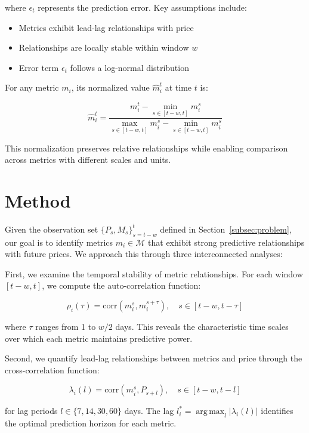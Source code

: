 \documentclass{article} %
\DeclareMathOperator*{\argmax}{arg\,max}
\begin{document}
where $\epsilon_t$ represents the prediction error. Key assumptions include:
\begin{itemize}
    \item Metrics exhibit lead-lag relationships with price
    \item Relationships are locally stable within window $w$
    \item Error term $\epsilon_t$ follows a log-normal distribution
\end{itemize}

For any metric $m_i$, its normalized value $\hat{m}_i^t$ at time $t$ is:

\begin{equation}
\hat{m}_i^t = \frac{m_i^t - \min_{s \in [t-w,t]} m_i^s}{\max_{s \in [t-w,t]} m_i^s - \min_{s \in [t-w,t]} m_i^s}
\end{equation}

This normalization preserves relative relationships while enabling comparison across metrics with different scales and units.

\section{Method}
\label{sec:method}

Given the observation set $\{P_s, M_s\}_{s=t-w}^t$ defined in Section~\ref{subsec:problem}, our goal is to identify metrics $m_i \in \mathcal{M}$ that exhibit strong predictive relationships with future prices. We approach this through three interconnected analyses:

First, we examine the temporal stability of metric relationships. For each window $[t-w,t]$, we compute the auto-correlation function:

\begin{equation}
\rho_i(\tau) = \text{corr}(m_i^s, m_i^{s+\tau}), \quad s \in [t-w,t-\tau]
\end{equation}

where $\tau$ ranges from 1 to $w/2$ days. This reveals the characteristic time scales over which each metric maintains predictive power.

Second, we quantify lead-lag relationships between metrics and price through the cross-correlation function:

\begin{equation}
\lambda_i(l) = \text{corr}(m_i^s, P_{s+l}), \quad s \in [t-w,t-l]
\end{equation}

for lag periods $l \in \{7, 14, 30, 60\}$ days. The lag $l^*_i = \argmax_l |\lambda_i(l)|$ identifies the optimal prediction horizon for each metric.
\end{document}
